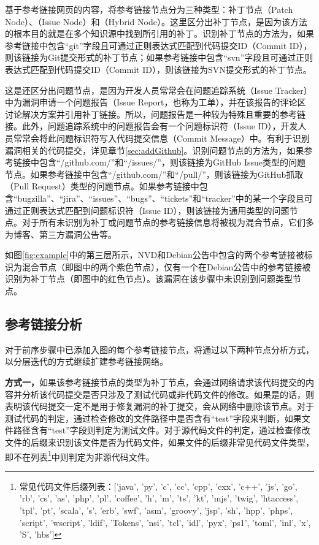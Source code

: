 基于参考链接网页的内容，\tool 将参考链接节点分为三种类型：补丁节点（Patch Node）、（Issue Node）和（Hybrid Node）。这里区分出补丁节点，是因为该方法的根本目的就是在多个知识源中找到所引用的补丁。识别补丁节点的方法为，如果参考链接中包含“git”字段且可通过正则表达式匹配到代码提交ID（Commit ID），则该链接为Git提交形式的补丁节点；如果参考链接中包含“svn”字段且可通过正则表达式匹配到代码提交ID（Commit ID），则该链接为SVN提交形式的补丁节点。

这是还区分出问题节点，是因为开发人员常常会在问题追踪系统（Issue Tracker）中为漏洞申请一个问题报告（Issue Report，也称为工单），并在该报告的评论区讨论解决方案并引用补丁链接。所以，问题报告是一种较为特殊且重要的参考链接。此外，问题追踪系统中的问题报告会有一个问题标识符（Issue ID），开发人员常常会将此问题标识符写入代码提交信息（Commit Message）中。有利于识别漏洞相关的代码提交，详见章节\ref{sec:addGithub}。识别问题节点的方法为，如果参考链接中包含“/github.com/”和“/issues/”，则该链接为GitHub Issue类型的问题节点。如果参考链接中包含“/github.com/”和“/pull/”，则该链接为GitHub抓取（Pull Request）类型的问题节点。如果参考链接中包含“bugzilla”、“jira”、“issues”、“bugs”、“tickets”和“tracker”中的某一个字段且可通过正则表达式匹配到问题标识符（Issue ID），则该链接为通用类型的问题节点。对于所有未识别为补丁或问题节点的参考链接信息将被视为混合节点，它们多为博客、第三方漏洞公告等。


\begin{exmp}
如图\ref{fig:example}中的第三层所示，NVD和Debian公告中包含的两个参考链接被标识为混合节点（即图中的两个紫色节点），仅有一个在Debian公告中的参考链接被识别为补丁节点（即图中的红色节点）。该漏洞在该步骤中未识别到问题类型节点。
\end{exmp}

\subsection{参考链接分析}
对于前序步骤中已添加入图的每个参考链接节点，\tool 将通过以下两种节点分析方式，以分层迭代的方式继续扩建参考链接网络。%

\textbf{方式一，}如果该参考链接节点的类型为补丁节点，\tool 会通过网络请求该代码提交的内容并分析该代码提交是否只涉及了测试代码或非代码文件的修改。如果是的话，则表明该代码提交一定不是用于修复漏洞的补丁提交，\tool 会从网络中删除该节点。对于测试代码的判定，\tool 通过检查修改的文件路径中是否含有“test”字段来判断，如果文件路径含有“test”字段则判定为测试文件。对于源代码文件的判定，\tool 通过检查修改文件的后缀来识别该文件是否为代码文件，如果文件的后缀非常见代码文件类型，即不在列表\footnote{常见代码文件后缀列表：['java', 'py', 'c', 'cc', 'cpp', 'cxx', 'c++', 'js', 'go', 'rb', 'cs', 'as', 'php', 'pl', 'coffee', 'h', 'm', 'ts', 'kt', 'mjs', 'twig', 'htaccess', 'tpl', 'pt', 'scala', 's', 'erb', 'swf', 'asm', 'groovy', 'jsp', 'sh', 'hpp', 'phps', 'script', 'wscript', 'ldif', 'Tokens', 'nsi', 'tcl', 'idl', 'pyx', 'ps1', 'toml', 'inl', 'x', 'S', 'hbs']}中则判定为非源代码文件。

